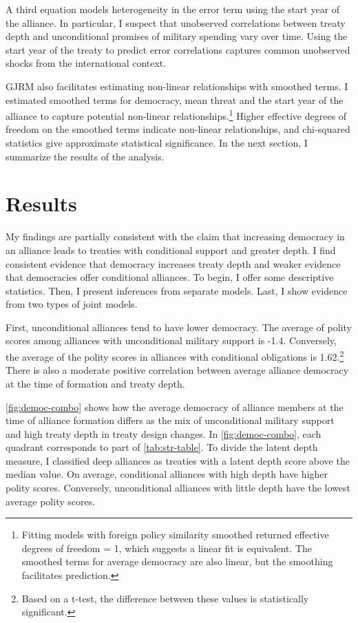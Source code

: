 \documentclass[12pt]{article}
\begin{document}
A third equation models heterogeneity in the error term using the start year of the alliance. 
In particular, I suspect that unobserved correlations between treaty depth and unconditional promises of military spending vary over time. 
Using the start year of the treaty to predict error correlations captures common unobserved shocks from the international context. 


GJRM also facilitates estimating non-linear relationships with smoothed terms. 
I estimated smoothed terms for democracy, mean threat and the start year of the alliance to capture potential non-linear relationships.\footnote{Fitting models with foreign policy similarity smoothed returned effective degrees of freedom = 1, which suggests a linear fit is equivalent. The smoothed terms for average democracy are also linear, but the smoothing facilitates prediction.}  
Higher effective degrees of freedom on the smoothed terms indicate non-linear relationships, and chi-squared statistics give approximate statistical significance. 
In the next section, I summarize the results of the analysis. 



\section{Results}


My findings are partially consistent with the claim that increasing democracy in an alliance leads to treaties with conditional support and greater depth. 
I find consistent evidence that democracy increases treaty depth and weaker evidence that democracies offer conditional alliances. 
To begin, I offer some descriptive statistics.
Then, I present inferences from separate models. 
Last, I show evidence from two types of joint models. 


First, unconditional alliances tend to have lower democracy. 
The average of polity scores among alliances with unconditional military support is -1.4. 
Conversely, the average of the polity scores in alliances with conditional obligations is 1.62.\footnote{Based on a t-test, the difference between these values is statistically significant.} 
There is also a moderate positive correlation between average alliance democracy at the time of formation and treaty depth. 


\autoref{fig:democ-combo} shows how the average democracy of alliance members at the time of alliance formation differs as the mix of unconditional military support and high treaty depth in treaty design changes.
In \autoref{fig:democ-combo}, each quadrant corresponds to part of \autoref{tab:str-table}.
To divide the latent depth measure, I classified deep alliances as treaties with a latent depth score above the median value. 
On average, conditional alliances with high depth have higher polity scores. 
Conversely, unconditional alliances with little depth have the lowest average polity scores. 
\end{document}
